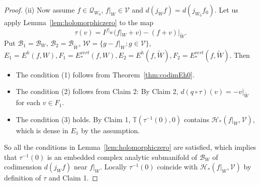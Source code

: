 \documentclass{amsart}
\numberwithin{equation}{section}
\theoremstyle{definition}
\theoremstyle{remark}
\begin{document}
\begin{proof}
(ii) Now assume $f\in \mathcal{Q}_{W_0}$, $f|_W\in \mathcal{V}$ and $d(j_{W}f)=d(j_{W_0}f_0)$. Let us apply Lemma~\ref{lem:holomorphiczero} to the map 
$$\tau(v)=I^{f|_W}(f|_W+v)-(f+v)|_{\widetilde{W}}.$$
Put $\mathcal{B}_1=\mathcal{B}_{W}$, $\mathcal{B}_2=\mathcal{B}_{\widetilde{W}}$, $\mathcal{W}=\{g-f|_W:g\in \mathcal{V}\}$, $E_1=E^h(f,W), F_1=E^{vert}_*(f,W), E_2=E^h(f,\widetilde{W}), F_2=E^{vert}_*(f,\widetilde{W}).$
Then 
\begin{itemize}
\item The condition (1) follows from Theorem~\ref{thm:codimEh0}.
\item The condition (2) follows from Claim 2: By Claim 2,  $d(q\circ \tau) (v)=-v|_{\widetilde{W}}$ for each $v\in F_1$.
\item The condition (3) holds. By Claim 1, $\mathbb{T}(\tau^{-1}(0),0)$ contains $\mathcal{H}_*(f|_W, \mathcal{V})$, which is dense in $E_1$ by the assumption. 
\end{itemize}
So all the conditions in Lemma~\ref{lem:holomorphiczero} are satisfied,  which implies that $\tau^{-1}(0)$ is an embedded complex analytic submanifold of $\mathcal{B}_W$ of codimension $d(j_Wf)$ near $f|_W$. Locally $\tau^{-1}(0)$ coincide with $\mathcal{H}_*(f|_W, \mathcal{V})$ by definition of $\tau$ and Claim 1. 
\end{proof}
\end{document}

